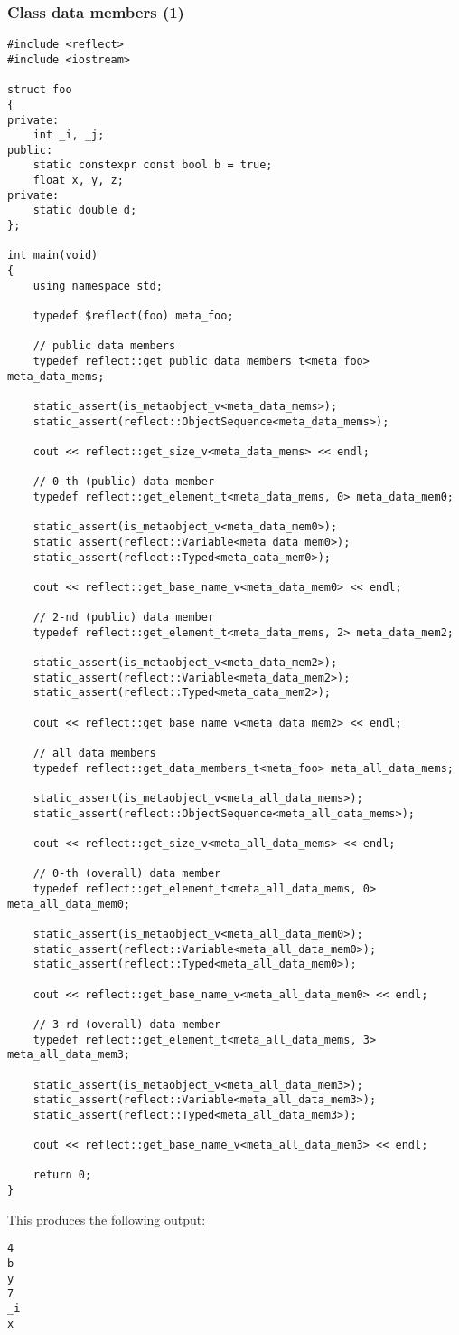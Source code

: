 \subsubsection{Class data members (1)}

\begin{verbatim}
#include <reflect>
#include <iostream>

struct foo
{
private:
	int _i, _j;
public:
	static constexpr const bool b = true;
	float x, y, z;
private:
	static double d;
};

int main(void)
{
	using namespace std;

	typedef $reflect(foo) meta_foo;

	// public data members
	typedef reflect::get_public_data_members_t<meta_foo> meta_data_mems;

	static_assert(is_metaobject_v<meta_data_mems>);
	static_assert(reflect::ObjectSequence<meta_data_mems>);

	cout << reflect::get_size_v<meta_data_mems> << endl;

	// 0-th (public) data member
	typedef reflect::get_element_t<meta_data_mems, 0> meta_data_mem0;

	static_assert(is_metaobject_v<meta_data_mem0>);
	static_assert(reflect::Variable<meta_data_mem0>);
	static_assert(reflect::Typed<meta_data_mem0>);

	cout << reflect::get_base_name_v<meta_data_mem0> << endl;

	// 2-nd (public) data member
	typedef reflect::get_element_t<meta_data_mems, 2> meta_data_mem2;

	static_assert(is_metaobject_v<meta_data_mem2>);
	static_assert(reflect::Variable<meta_data_mem2>);
	static_assert(reflect::Typed<meta_data_mem2>);

	cout << reflect::get_base_name_v<meta_data_mem2> << endl;

	// all data members
	typedef reflect::get_data_members_t<meta_foo> meta_all_data_mems;

	static_assert(is_metaobject_v<meta_all_data_mems>);
	static_assert(reflect::ObjectSequence<meta_all_data_mems>);

	cout << reflect::get_size_v<meta_all_data_mems> << endl;

	// 0-th (overall) data member
	typedef reflect::get_element_t<meta_all_data_mems, 0> meta_all_data_mem0;

	static_assert(is_metaobject_v<meta_all_data_mem0>);
	static_assert(reflect::Variable<meta_all_data_mem0>);
	static_assert(reflect::Typed<meta_all_data_mem0>);

	cout << reflect::get_base_name_v<meta_all_data_mem0> << endl;

	// 3-rd (overall) data member
	typedef reflect::get_element_t<meta_all_data_mems, 3> meta_all_data_mem3;

	static_assert(is_metaobject_v<meta_all_data_mem3>);
	static_assert(reflect::Variable<meta_all_data_mem3>);
	static_assert(reflect::Typed<meta_all_data_mem3>);

	cout << reflect::get_base_name_v<meta_all_data_mem3> << endl;

	return 0;
}

\end{verbatim}

This produces the following output:

\begin{verbatim}
4
b
y
7
_i
x
\end{verbatim}
